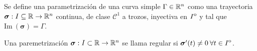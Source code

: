 
\begin{definition}
    Se define una parametrizaci\'on de una curva simple $\Gamma\in\mathbb{R}^n$ como una trayectoria $\boldsymbol{\sigma}:I\subseteq\mathbb{R}\to\mathbb{R}^n$ continua, de clase $\mathcal{C}^1$ a trozos, inyectiva en ${\kern0ptI}^{\mathrm{o}}$ y tal que  $\text{Im}\:(\boldsymbol{\sigma})=\Gamma$.
\end{definition}

\begin{definition}
    Una paremetrizaci\'on $\boldsymbol{\sigma}:I\subset\mathbb{R}\to\mathbb{R}^n$ se llama regular si $\boldsymbol{\sigma}'(t)\neq0 \: \forall t\in{\kern0ptI}^{\mathrm{o}}$.
\end{definition}